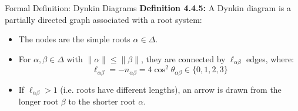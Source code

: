 \begin{frame}[label=backup_dynkin]{Formal Definition: Dynkin Diagrams}
    \textbf{Definition 4.4.5:}
    A Dynkin diagram is a partially directed graph associated with a root system:
    \begin{itemize}
        \item The nodes are the simple roots $\alpha \in \Delta$.
        \item For $\alpha, \beta \in \Delta$ with $\|\alpha\| \le \|\beta\|$, they are connected by $\ell_{\alpha\beta}$ edges, where:
              $$ \ell_{\alpha\beta} = -n_{\alpha\beta} = 4 \cos^2 \theta_{\alpha\beta} \in \{0, 1, 2, 3\} $$
        \item If $\ell_{\alpha\beta} > 1$ (i.e. roots have different lengths), an arrow is drawn from the longer root $\beta$ to the shorter root $\alpha$.
    \end{itemize}
\end{frame}